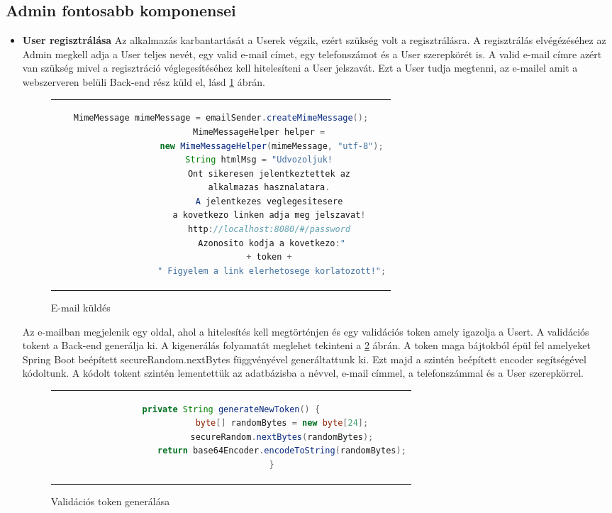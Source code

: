 \subsection{Admin fontosabb komponensei}
\begin{itemize}
	\item \textbf{User regisztrálása} 
Az alkalmazás karbantartását a Userek végzik, ezért szükség volt a regisztrálásra. A regisztrálás elvégézéséhez az Admin megkell adja a User teljes nevét, egy valid e-mail címet, egy telefonszámot és a User szerepkörét is. A valid e-mail címre azért van szükség mivel a regisztráció véglegesítéséhez kell hitelesíteni a User jelszavát. Ezt a User tudja megtenni, az e-mailel amit a webszerveren belüli Back-end rész küld el, lásd \ref{emailSending} ábrán.
	\begin{figure}[thp]
		\centering
		\caption{E-mail küldés}
		\label{emailSending}
		\begin{tabular}{c}
			\begin{lstlisting}[language=JAVA]
				MimeMessage mimeMessage = emailSender.createMimeMessage();
				MimeMessageHelper helper = 
					new MimeMessageHelper(mimeMessage, "utf-8");
				String htmlMsg = "Udvozoljuk! 
					Ont sikeresen jelentkeztettek az 
					alkalmazas hasznalatara. 
					A jelentkezes veglegesitesere 
					a kovetkezo linken adja meg jelszavat! 
					http://localhost:8080/#/password 
					Azonosito kodja a kovetkezo:"
					+ token + 
					" Figyelem a link elerhetosege korlatozott!";
			\end{lstlisting}
		\end{tabular}
	\end{figure}
	
Az e-mailban megjelenik egy oldal, ahol a hitelesítés kell megtörténjen és egy validációs token amely igazolja a Usert. A validációs tokent a Back-end generálja ki. A kigenerálás folyamatát meglehet tekinteni a \ref{tokenGen} ábrán. A token maga bájtokból épül fel amelyeket Spring Boot beépített secureRandom.nextBytes függvényével generáltattunk ki. Ezt majd a szintén beépített encoder segítségével kódoltunk. A kódolt tokent szintén lementettük az adatbázisba a névvel, e-mail címmel, a telefonszámmal és a User szerepkörrel.
	\begin{figure}[thp]
		\centering
		\caption{Validációs token generálása}
		\label{tokenGen}
		\begin{tabular}{c}
			\begin{lstlisting}[language=JAVA]
				private String generateNewToken() {
					byte[] randomBytes = new byte[24];
					secureRandom.nextBytes(randomBytes);
					return base64Encoder.encodeToString(randomBytes);
				}
			\end{lstlisting}
		\end{tabular}
	\end{figure}
	

\end{itemize}

